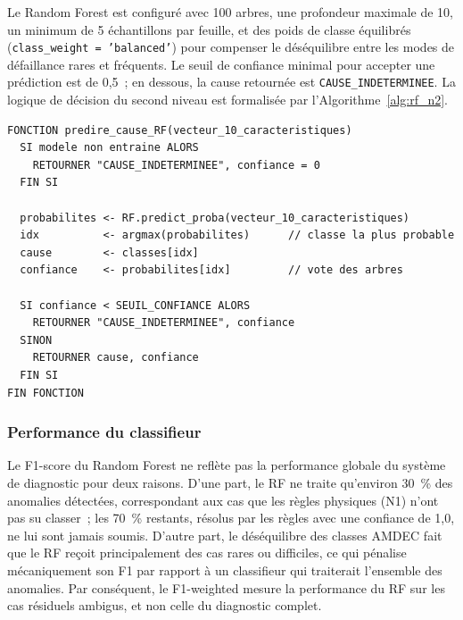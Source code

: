 Le Random Forest est configuré avec 100 arbres, une profondeur maximale de 10, un minimum de 5 échantillons par feuille, et des poids de classe équilibrés (\texttt{class\_weight = 'balanced'}) pour compenser le déséquilibre entre les modes de défaillance rares et fréquents. Le seuil de confiance minimal pour accepter une prédiction est de 0,5~; en dessous, la cause retournée est \texttt{CAUSE\_INDETERMINEE}. La logique de décision du second niveau est formalisée par l'Algorithme~\ref{alg:rf_n2}.

\begin{algorithm}[htbp]
\caption{Classification de la cause par le Random Forest (niveau N2)}
\label{alg:rf_n2}
\begin{minipage}{0.95\textwidth}
\footnotesize
\begin{verbatim}
FONCTION predire_cause_RF(vecteur_10_caracteristiques)
  SI modele non entraine ALORS
    RETOURNER "CAUSE_INDETERMINEE", confiance = 0
  FIN SI

  probabilites <- RF.predict_proba(vecteur_10_caracteristiques)
  idx          <- argmax(probabilites)      // classe la plus probable
  cause        <- classes[idx]
  confiance    <- probabilites[idx]         // vote des arbres

  SI confiance < SEUIL_CONFIANCE ALORS
    RETOURNER "CAUSE_INDETERMINEE", confiance
  SINON
    RETOURNER cause, confiance
  FIN SI
FIN FONCTION
\end{verbatim}
\end{minipage}
\end{algorithm}

\subsubsection{Performance du classifieur}

Le F1-score du Random Forest ne reflète pas la performance globale du système de diagnostic pour deux raisons. D'une part, le RF ne traite qu'environ 30~\% des anomalies détectées, correspondant aux cas que les règles physiques (N1) n'ont pas su classer~; les 70~\% restants, résolus par les règles avec une confiance de 1,0, ne lui sont jamais soumis. D'autre part, le déséquilibre des classes AMDEC fait que le RF reçoit principalement des cas rares ou difficiles, ce qui pénalise mécaniquement son F1 par rapport à un classifieur qui traiterait l'ensemble des anomalies. Par conséquent, le F1-weighted mesure la performance du RF sur les cas résiduels ambigus, et non celle du diagnostic complet.

